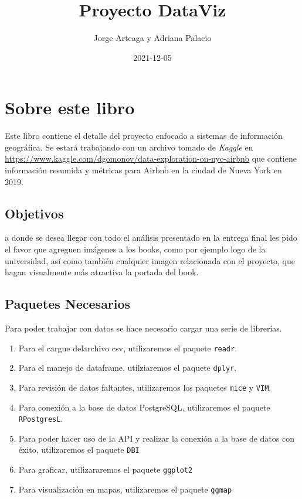 \documentclass[
]{book}
\title{Proyecto DataViz}
\author{Jorge Arteaga y Adriana Palacio}
\date{2021-12-05}
\providecommand{\tightlist}{%
  \setlength{\itemsep}{0pt}\setlength{\parskip}{0pt}}
\begin{document}
\maketitle

{
\setcounter{tocdepth}{1}
\tableofcontents
}
\hypertarget{sobre-este-libro}{%
\chapter{Sobre este libro}\label{sobre-este-libro}}

Este libro contiene el detalle del proyecto enfocado a sistemas de información geográfica. Se estará trabajando con un archivo tomado de \emph{Kaggle} en \url{https://www.kaggle.com/dgomonov/data-exploration-on-nyc-airbnb} que contiene información resumida y métricas para Airbnb en la ciudad de Nueva York en 2019.

\hypertarget{objetivos}{%
\section{Objetivos}\label{objetivos}}

a donde se desea llegar con todo el análisis presentado
en la entrega final les pido el favor que agreguen imágenes a los books, como por ejemplo logo de la universidad, así como también cualquier imagen relacionada con el proyecto, que hagan visualmente más atractiva la portada del book.

\hypertarget{paquetes-necesarios}{%
\section{Paquetes Necesarios}\label{paquetes-necesarios}}

Para poder trabajar con datos se hace necesario cargar una serie de librerías.

\begin{enumerate}
\def\labelenumi{\arabic{enumi}.}
\tightlist
\item
  Para el cargue delarchivo csv, utilizaremos el paquete \texttt{readr}.
\item
  Para el manejo de dataframe, utilziaremos el paquete \texttt{dplyr}.
\item
  Para revisión de datos faltantes, utilizaremos los paquetes \texttt{mice} y \texttt{VIM}.
\item
  Para conexión a la base de datos PostgreSQL, utilizaremos el paquete \texttt{RPostgresL}.
\item
  Para poder hacer uso de la API y realizar la conexión a la base de datos con éxito, utilizaremos el paquete \texttt{DBI}
\item
  Para graficar, utilizararemos el paquete \texttt{ggplot2}
\item
  Para visualización en mapas, utilizaremos el paquete \texttt{ggmap}
\end{enumerate}
\end{document}
